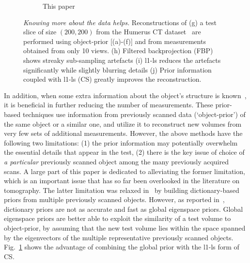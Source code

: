 \documentclass[journal]{IEEEtran}
\begin{document}
\begin{figure}[!h]
\begin{subfigure}[b]{0.23\linewidth}
        \caption{This paper}
     \end{subfigure}
    \caption{\textit{Knowing more about the data helps.} Reconstructions of (g) a test slice  of size $(200,200)$ from the Humerus CT dataset~\cite{humerus} are performed using object-prior [(a)-(f)] and from measurements obtained from only 10 views. (h) Filtered backprojection (FBP) shows streaky sub-sampling artefacts (i) l1-ls reduces the artefacts significantly while slightly blurring details (j) Prior information coupled with l1-ls (CS) greatly improves the reconstruction.}
\label{fig:diff_methods}
\end{figure}

In addition, when some extra information about the object's structure is known~\cite{PICCS,cardiacPICCS,lubner2011,pirple,mota2017}, it is beneficial in further reducing the number of measurements.  These prior-based techniques use information from previously scanned data (`object-prior') of the same object or a similar one, and utilize it to reconstruct new volumes from very few sets of additional measurements. However, the above methods have the following two limitations: (1) the prior information may potentially overwhelm the essential details that appear in the test, (2) there is the key issue of choice of \textit{a particular} previously scanned object among the many previously acquired scans. A large part of this paper is dedicated to alleviating the former limitation, which is an important issue that has so far been overlooked in the literature on tomography. The latter limitation was relaxed in~\cite{liu2016,Xu2012} by building dictionary-based priors from multiple previously scanned objects. However, as reported in~\cite{my_dicta_paper}, dictionary priors are not as accurate and fast as global eigenspace priors.  Global eigenspace priors are better able to exploit the similarity of a test volume to object-prior, by assuming that the new test volume lies within the space spanned by the eigenvectors of the multiple representative previously scanned objects. Fig.~\ref{fig:diff_methods} shows the advantage of combining the global prior with the l1-ls form of CS.
\end{document}
